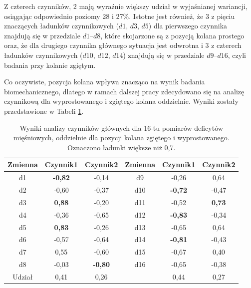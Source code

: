 Z czterech czynników, 2 mają wyraźnie większy udział w wyjaśnianej wariancji, osiągając odpowiednio poziomy 28 i 27\%. Istotne jest również, że 3 z pięciu znaczących ładunków czynnikowych ($d1$, $d3$, $d5$) dla pierwszego czynnika znajdują się w przedziale $d1$--$d8$, które skojarzone są z pozycją kolana prostego oraz, że dla drugiego czynnika głównego sytuacja jest odwrotna i 3 z czterech ładunków czynnikowych ($d10$, $d12$, $d14$) znajdują się w przedziale $d9$--$d16$, czyli badania przy kolanie zgiętym. 

Co oczywiste, pozycja kolana wpływa znacząco na wynik badania biomechanicznego, dlatego w ramach dalszej pracy zdecydowano się na  analizę czynnikową dla wyprostowanego i zgiętego kolana oddzielnie. Wyniki zostały przedstawione w Tabeli \ref{tab:pca-muscles-knee-strait-bended}. 

\begin{table}[h]
	\centering
	\setlength{\tabcolsep}{3pt}
	\setlength\extrarowheight{2pt}
	\caption{Wyniki analizy czynników głównych dla 16-tu pomiarów deficytów mięśniowych, oddzielnie dla pozycji kolana zgiętego i wyprostowanego. Oznaczono ładunki większe niż 0,7.}
	\label{tab:pca-muscles-knee-strait-bended}
	\begin{tabular}{c|c|c||c|c|c}
		
		Zmienna&Czynnik1&Czynnik2&Zmienna&Czynnik1&Czynnik2 \\
		\hline
		d1&\textbf{-0,82}&-0,14&d9&-0,26&0,64 \\
		\hline
		d2&-0,60&-0,37&d10&\textbf{-0,72}&-0,47 \\
		\hline
		d3&\textbf{0,88}&-0,20&d11&-0,52&\textbf{0,73} \\
		\hline
		d4&-0,36&-0,65&d12&\textbf{-0,83}&-0,34 \\
		\hline
		d5&\textbf{0,83}&-0,26&d13&-0,65&0,64 \\
		\hline
		d6&-0,57&-0,64&d14&\textbf{-0,81}&-0,43 \\
		\hline
		d7&0,55&-0,60&d15&-0,67&0,40 \\
		\hline
		d8&-0,03&\textbf{-0,80}&d16&-0,65&-0,38 \\
		\hline\hline
		Udział&0,41&0,26&&0,44&0,27 \\
		
	\end{tabular}
\end{table}

